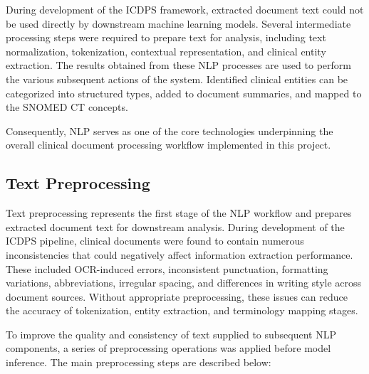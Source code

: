 During development of the ICDPS framework, extracted document text could not be used directly by downstream machine learning models. Several intermediate processing steps were required to prepare text for analysis, including text normalization, tokenization, contextual representation, and clinical entity extraction. The results obtained from these NLP processes are used to perform the various subsequent actions of the system. Identified clinical entities can be categorized into structured types, added to document summaries, and mapped to the SNOMED CT concepts.

Consequently, NLP serves as one of the core technologies underpinning the overall clinical document processing workflow implemented in this project.

\subsection{Text Preprocessing}

Text preprocessing represents the first stage of the NLP workflow and prepares extracted document text for downstream analysis. During development of the ICDPS pipeline, clinical documents were found to contain numerous inconsistencies that could negatively affect information extraction performance. These included OCR-induced errors, inconsistent punctuation, formatting variations, abbreviations, irregular spacing, and differences in writing style across document sources. Without appropriate preprocessing, these issues can reduce the accuracy of tokenization, entity extraction, and terminology mapping stages.

To improve the quality and consistency of text supplied to subsequent NLP components, a series of preprocessing operations was applied before model inference. The main preprocessing steps are described below:

